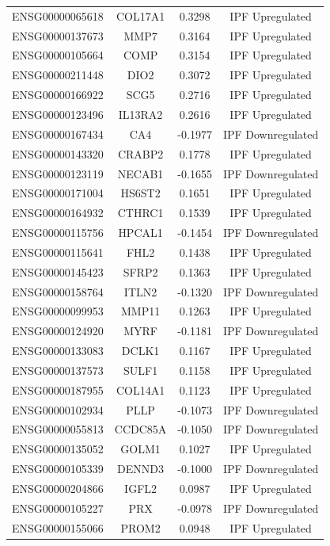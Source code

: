 \documentclass[
]{article}
\begin{document}
\begin{singlespace}
\begin{longtable}[t]{lccc}
\endfoot
\bottomrule
\endlastfoot
ENSG00000065618 & COL17A1 & 0.3298 & IPF Upregulated\\
ENSG00000137673 & MMP7 & 0.3164 & IPF Upregulated\\
ENSG00000105664 & COMP & 0.3154 & IPF Upregulated\\
ENSG00000211448 & DIO2 & 0.3072 & IPF Upregulated\\
ENSG00000166922 & SCG5 & 0.2716 & IPF Upregulated\\
\addlinespace
ENSG00000123496 & IL13RA2 & 0.2616 & IPF Upregulated\\
ENSG00000167434 & CA4 & -0.1977 & IPF Downregulated\\
ENSG00000143320 & CRABP2 & 0.1778 & IPF Upregulated\\
ENSG00000123119 & NECAB1 & -0.1655 & IPF Downregulated\\
ENSG00000171004 & HS6ST2 & 0.1651 & IPF Upregulated\\
\addlinespace
ENSG00000164932 & CTHRC1 & 0.1539 & IPF Upregulated\\
ENSG00000115756 & HPCAL1 & -0.1454 & IPF Downregulated\\
ENSG00000115641 & FHL2 & 0.1438 & IPF Upregulated\\
ENSG00000145423 & SFRP2 & 0.1363 & IPF Upregulated\\
ENSG00000158764 & ITLN2 & -0.1320 & IPF Downregulated\\
\addlinespace
ENSG00000099953 & MMP11 & 0.1263 & IPF Upregulated\\
ENSG00000124920 & MYRF & -0.1181 & IPF Downregulated\\
ENSG00000133083 & DCLK1 & 0.1167 & IPF Upregulated\\
ENSG00000137573 & SULF1 & 0.1158 & IPF Upregulated\\
ENSG00000187955 & COL14A1 & 0.1123 & IPF Upregulated\\
\addlinespace
ENSG00000102934 & PLLP & -0.1073 & IPF Downregulated\\
ENSG00000055813 & CCDC85A & -0.1050 & IPF Downregulated\\
ENSG00000135052 & GOLM1 & 0.1027 & IPF Upregulated\\
ENSG00000105339 & DENND3 & -0.1000 & IPF Downregulated\\
ENSG00000204866 & IGFL2 & 0.0987 & IPF Upregulated\\
\addlinespace
ENSG00000105227 & PRX & -0.0978 & IPF Downregulated\\
ENSG00000155066 & PROM2 & 0.0948 & IPF Upregulated\\

\end{longtable}
\end{singlespace}
\end{document}
